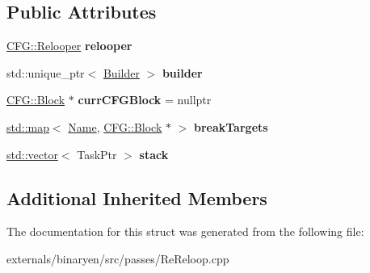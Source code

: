 \subsection*{Public Attributes}
\begin{DoxyCompactItemize}
\item 
\mbox{\label{structwasm_1_1_re_reloop_a4332effbde318f4bbeca5938e442b90a}} 
\mbox{\hyperlink{struct_c_f_g_1_1_relooper}{C\+F\+G\+::\+Relooper}} {\bfseries relooper}
\item 
\mbox{\label{structwasm_1_1_re_reloop_a5fdf3508d306a9b5f21d93fd73bff20b}} 
std\+::unique\+\_\+ptr$<$ \mbox{\hyperlink{classwasm_1_1_builder}{Builder}} $>$ {\bfseries builder}
\item 
\mbox{\label{structwasm_1_1_re_reloop_a469786aa11b98ddc20dcd2feee6745ab}} 
\mbox{\hyperlink{struct_c_f_g_1_1_block}{C\+F\+G\+::\+Block}} $\ast$ {\bfseries curr\+C\+F\+G\+Block} = nullptr
\item 
\mbox{\label{structwasm_1_1_re_reloop_a755e08f539506b28464098698c853113}} 
\mbox{\hyperlink{classstd_1_1map}{std\+::map}}$<$ \mbox{\hyperlink{structwasm_1_1_name}{Name}}, \mbox{\hyperlink{struct_c_f_g_1_1_block}{C\+F\+G\+::\+Block}} $\ast$ $>$ {\bfseries break\+Targets}
\item 
\mbox{\label{structwasm_1_1_re_reloop_a1204d0704834305dea612aa044e09b7d}} 
\mbox{\hyperlink{classstd_1_1vector}{std\+::vector}}$<$ Task\+Ptr $>$ {\bfseries stack}
\end{DoxyCompactItemize}
\subsection*{Additional Inherited Members}


The documentation for this struct was generated from the following file\+:\begin{DoxyCompactItemize}
\item 
externals/binaryen/src/passes/Re\+Reloop.\+cpp\end{DoxyCompactItemize}
